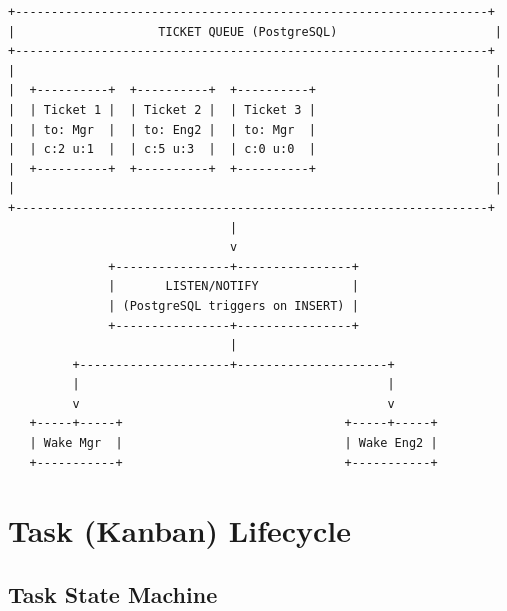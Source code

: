 \documentclass[11pt,a4paper]{article}
\begin{document}
\begin{verbatim}
+------------------------------------------------------------------+
|                    TICKET QUEUE (PostgreSQL)                      |
+------------------------------------------------------------------+
|                                                                   |
|  +----------+  +----------+  +----------+                         |
|  | Ticket 1 |  | Ticket 2 |  | Ticket 3 |                         |
|  | to: Mgr  |  | to: Eng2 |  | to: Mgr  |                         |
|  | c:2 u:1  |  | c:5 u:3  |  | c:0 u:0  |                         |
|  +----------+  +----------+  +----------+                         |
|                                                                   |
+------------------------------------------------------------------+
                               |
                               v
              +----------------+----------------+
              |       LISTEN/NOTIFY             |
              | (PostgreSQL triggers on INSERT) |
              +----------------+----------------+
                               |
         +---------------------+---------------------+
         |                                           |
         v                                           v
   +-----+-----+                               +-----+-----+
   | Wake Mgr  |                               | Wake Eng2 |
   +-----------+                               +-----------+
\end{verbatim}

\section{Task (Kanban) Lifecycle}

\subsection{Task State Machine}
\end{document}
